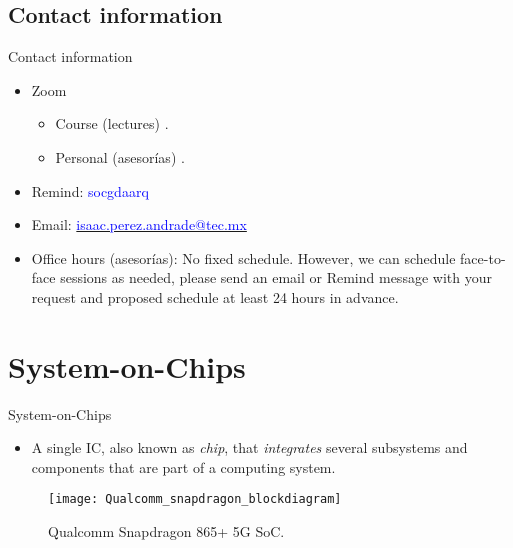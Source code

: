 \documentclass[]{slides}
\begin{document}
\subsection{Contact information}
\begin{frame}{Contact information}
\begin{itemize}
\item Zoom 
\begin{itemize}
  \item Course (lectures) .
  \item Personal (asesorías) .
\end{itemize}
\item Remind: \textcolor{blue}{socgdaarq}
\item Email: \href{mailto:isaac.perez.andrade@tec.mx}{\textcolor{blue}{isaac.perez.andrade@tec.mx}}
\item Office hours (asesorías): No fixed schedule. However, we can schedule face-to-face sessions as needed, please send an email or Remind message with your request and proposed schedule at least 24 hours in advance.
\end{itemize}
\end{frame}

\section{System-on-Chips}
\begin{frame}{System-on-Chips}
\pauseprint
\begin{itemize}
  \item A single \acf{IC}, also known as \emph{chip}, that \emph{integrates} several subsystems and components that are part of a computing system.
\end{itemize}
  \begin{figure}
  \texttt{[image: Qualcomm\_snapdragon\_blockdiagram]}
  \label{Figure:QualcommSnapdragon}
  \vspace{-5pt}
  \caption{Qualcomm Snapdragon 865+ 5G \acs{SoC}.}
  \end{figure}
\end{frame}
\end{document}
